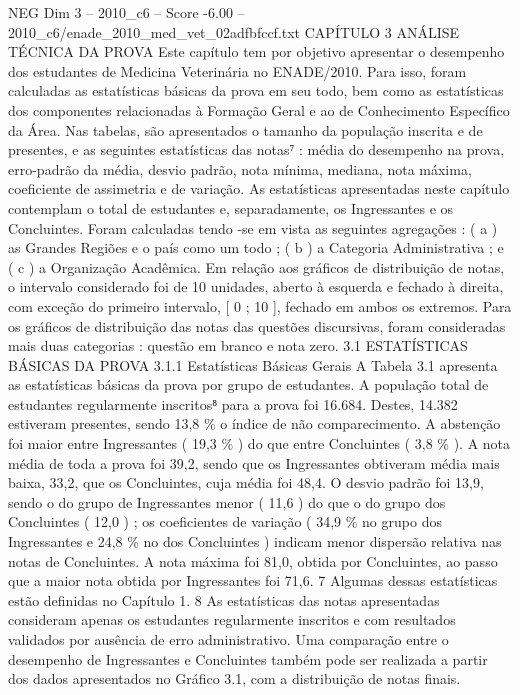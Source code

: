 \begin{textsample}{NEG Dim 3 – 2010\_c6 – Score -6.00 – 2010\_c6/enade\_2010\_med\_vet\_02adfbfccf.txt}  \label{ex:f3_neg_018}
CAPÍTULO 3 ANÁLISE TÉCNICA DA PROVA Este capítulo tem por objetivo apresentar o desempenho dos estudantes de Medicina Veterinária no ENADE/2010.
Para isso, foram calculadas as estatísticas básicas da prova em seu todo, bem como as estatísticas dos componentes relacionadas à Formação Geral e ao de Conhecimento Específico da Área.
Nas tabelas, são apresentados o tamanho da população inscrita e de presentes, e as seguintes estatísticas das notas⁷ : média do desempenho na prova, erro-padrão da média, desvio padrão, nota mínima, mediana, nota máxima, coeficiente de assimetria e de variação.
As estatísticas apresentadas neste capítulo contemplam o total de estudantes e, separadamente, os Ingressantes e os Concluintes.
Foram calculadas tendo -se em vista as seguintes agregações : ( a ) as Grandes Regiões e o país como um todo ; ( b ) a Categoria Administrativa ; e ( c ) a Organização Acadêmica.
Em relação aos gráficos de distribuição de notas, o intervalo considerado foi de 10 unidades, aberto à esquerda e fechado à direita, com exceção do primeiro intervalo, [ 0 ; 10 ], fechado em ambos os extremos.
Para os gráficos de distribuição das notas das questões discursivas, foram consideradas mais duas categorias : questão em branco e nota zero. 3.1 ESTATÍSTICAS BÁSICAS DA PROVA 3.1.1 Estatísticas Básicas Gerais A Tabela 3.1 apresenta as estatísticas básicas da prova por grupo de estudantes.
A população total de estudantes regularmente inscritos⁸ para a prova foi 16.684.
Destes, 14.382 estiveram presentes, sendo 13,8 \% o índice de não comparecimento.
A abstenção foi maior entre Ingressantes ( 19,3 \% ) do que entre Concluintes ( 3,8 \% ).
A nota média de toda a prova foi 39,2, sendo que os Ingressantes obtiveram média mais baixa, 33,2, que os Concluintes, cuja média foi 48,4.
O desvio padrão foi 13,9, sendo o do grupo de Ingressantes menor ( 11,6 ) do que o do grupo dos Concluintes ( 12,0 ) ; os coeficientes de variação ( 34,9 \% no grupo dos Ingressantes e 24,8 \% no dos Concluintes ) indicam menor dispersão relativa nas notas de Concluintes.
A nota máxima foi 81,0, obtida por Concluintes, ao passo que a maior nota obtida por Ingressantes foi 71,6. 7 Algumas dessas estatísticas estão definidas no Capítulo 1. 8 As estatísticas das notas apresentadas consideram apenas os estudantes regularmente inscritos e com resultados validados por ausência de erro administrativo.
Uma comparação entre o desempenho de Ingressantes e Concluintes também pode ser realizada a partir dos dados apresentados no Gráfico 3.1, com a distribuição de notas finais.

\end{textsample}
